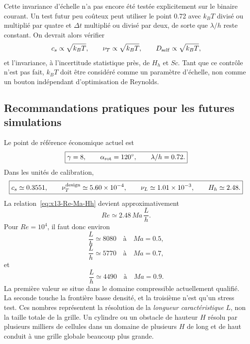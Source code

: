 \documentclass[11pt,a4paper]{article}
\begin{document}
Cette invariance d'échelle n'a pas encore été testée explicitement sur le binaire courant. Un test futur peu coûteux peut utiliser le point 0.72 avec $k_BT$ divisé ou multiplié par quatre et $\Delta t$ multiplié ou divisé par deux, de sorte que $\lambda/h$ reste constant. On devrait alors vérifier
\begin{equation}
  c_s\propto\sqrt{k_BT},
  \qquad
  \nu_T\propto\sqrt{k_BT},
  \qquad
  D_{\rm self}\propto\sqrt{k_BT},
\end{equation}
et l'invariance, à l'incertitude statistique près, de $H_h$ et $Sc$. Tant que ce contrôle n'est pas fait, $k_BT$ doit être considéré comme un paramètre d'échelle, non comme un bouton indépendant d'optimisation de Reynolds.

\subsection{Recommandations pratiques pour les futures simulations}

Le point de référence économique actuel est
\begin{equation}
  \boxed{
  \gamma=8,
  \qquad
  \alpha_{\rm rot}=120^\circ,
  \qquad
  \lambda/h=0.72.
  }
  \label{eq:x13-reference}
\end{equation}
Dans les unités de calibration,
\begin{equation}
  \boxed{
  c_s\simeq0.3551,
  \qquad
  \nu_T^{\rm design}\simeq5.60\times10^{-4},
  \qquad
  \nu_L\simeq1.01\times10^{-3},
  \qquad
  H_h\simeq2.48.
  }
  \label{eq:x13-reference-values}
\end{equation}
La relation~\eqref{eq:x13-Re-Ma-Hh} devient approximativement
\begin{equation}
  Re\simeq2.48\,Ma\,\frac{L}{h}.
\end{equation}
Pour $Re=10^4$, il faut donc environ
\begin{equation}
  \frac{L}{h}\simeq8080
  \quad\text{à}\quad Ma=0.5,
\end{equation}
\begin{equation}
  \frac{L}{h}\simeq5770
  \quad\text{à}\quad Ma=0.7,
\end{equation}
et
\begin{equation}
  \frac{L}{h}\simeq4490
  \quad\text{à}\quad Ma=0.9.
\end{equation}
La première valeur se situe dans le domaine compressible actuellement qualifié. La seconde touche la frontière basse densité, et la troisième n'est qu'un stress test. Ces nombres représentent la résolution de la \emph{longueur caractéristique} $L$, non la taille totale de la grille. Un cylindre ou un obstacle de hauteur $H$ résolu par plusieurs milliers de cellules dans un domaine de plusieurs $H$ de long et de haut conduit à une grille globale beaucoup plus grande.
\end{document}
